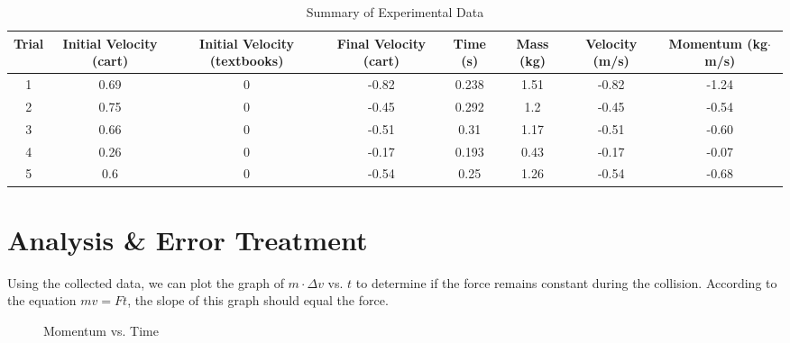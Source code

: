 \documentclass[12pt]{article}
\begin{document}
\begin{table}[H]
    \centering
    \caption{Summary of Experimental Data}
    \label{tab:data}
    \begin{tabular}{|c|c|c|c|c|c|c|c|}
        \hline
        Trial & Initial Velocity (cart) & Initial Velocity (textbooks) & Final Velocity (cart) & Time (s) & Mass (kg) & Velocity (m/s) & Momentum (kg$\cdot$m/s) \\ \hline
        1     & 0.69                   & 0                           & -0.82                 & 0.238    & 1.51      & -0.82         & -1.24 \\ \hline
        2     & 0.75                   & 0                           & -0.45                 & 0.292    & 1.2       & -0.45         & -0.54 \\ \hline
        3     & 0.66                   & 0                           & -0.51                 & 0.31     & 1.17      & -0.51         & -0.60 \\ \hline
        4     & 0.26                   & 0                           & -0.17                 & 0.193    & 0.43      & -0.17         & -0.07 \\ \hline
        5     & 0.6                    & 0                           & -0.54                 & 0.25     & 1.26      & -0.54         & -0.68 \\ \hline
    \end{tabular}
\end{table}

\section{Analysis \& Error Treatment}

Using the collected data, we can plot the graph of $m \cdot \Delta v$ vs. $t$ to determine if the force remains constant during the collision. According to the equation $mv = Ft$, the slope of this graph should equal the force.

\begin{figure}[H]
    \centering
    \caption{Momentum vs. Time}
    \label{fig:momentum_vs_time}
\end{figure}
\end{document}
